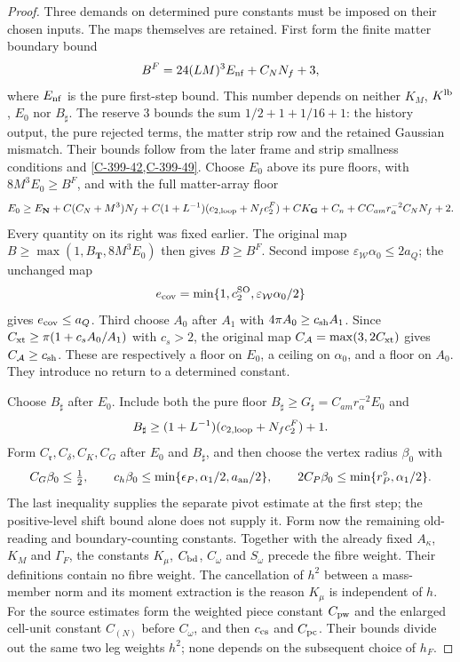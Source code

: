 \documentclass[11pt,letterpaper,reqno]{amsart}
\theoremstyle{definition}
\theoremstyle{remark}
\begin{document}
\begin{proof}
Three demands on determined pure constants must be imposed
on their chosen inputs. The maps themselves are retained.
First form the finite matter boundary bound
\[
 B^F=24(LM)^3E_{\rm nf}+C_NN_f+3,
\]
where $E_{\rm nf}$ is the pure first-step bound.
This number depends on neither $K_M$, $K^{\rm lb}$, $E_0$
nor $B_\sharp$. The reserve $3$ bounds the sum
$1/2+1+1/16+1$: the history output, the pure rejected
terms, the matter strip row and the retained Gaussian mismatch.
Their bounds follow from the later frame and strip smallness
conditions and \cref{C-399-42,C-399-49}. Choose $E_0$ above
its pure floors, with $8M^3E_0\ge B^F$, and with the full
matter-array floor
\[
 E_0\ge E_{\mathbf N}+C(C_N+M^3)N_f
 +C(1+L^{-1})(c_{2,\rm loop}+N_fc_2^F)
 +CK_{\mathbf G}+C_n+C C_{am}r_\alpha^{-2}C_NN_f+2.
\]
Every quantity on its right was fixed earlier.
The original map $B\ge\max(1,B_{\mathbf T},8M^3E_0)$ then
gives $B\ge B^F$. Second impose
$\varepsilon_{\mathcal W}\alpha_0\le2a_Q$; the unchanged map
\[
 e_{\rm cov}=\min\{1,c_2^{\rm SO},
                         \varepsilon_{\mathcal W}\alpha_0/2\}
\]
gives $e_{\rm cov}\le a_Q$.
Third choose $A_0$ after $A_1$ with
$4\pi A_0\ge c_{\rm sh}A_1$.
Since $C_{\rm xt}\ge\pi(1+c_sA_0/A_1)$ with $c_s>2$,
the original map $C_{\mathcal A}=\max(3,2C_{\rm xt})$
gives $C_{\mathcal A}\ge c_{\rm sh}$.
These are respectively a floor on $E_0$, a ceiling on
$\alpha_0$, and a floor on $A_0$. They introduce no return
to a determined constant.

Choose $B_\sharp$ after $E_0$. Include both the pure floor
$B_\sharp\ge G_\sharp=C_{am}r_\alpha^{-2}E_0$ and
\[
 B_\sharp\ge(1+L^{-1})(c_{2,\rm loop}+N_fc_2^F)+1.
\]
Form $C_{\mathfrak r},C_\delta,C_K,C_G$ after $E_0$ and
$B_\sharp$, and then choose the vertex radius $\beta_0$ with
\[
 C_G\beta_0\le\tfrac12,\qquad
 c_h\beta_0\le\min\{\epsilon_P,\alpha_1/2,a_{\rm an}/2\},
 \qquad 2C_P\beta_0\le\min\{r_P^\circ,\alpha_1/2\}.
\]
The last inequality supplies the separate pivot estimate at
the first step; the positive-level shift bound alone does
not supply it.
Form now the remaining old-reading and boundary-counting
constants. Together with the already fixed $A_\kappa$,
$K_M$ and $\Gamma_F$, the constants $K_\mu$, $C_{\rm bd}$,
$C_\omega$ and $S_\omega$ precede the fibre weight.
Their definitions contain no fibre weight. The cancellation of
$h^2$ between a mass-member norm and its moment extraction
is the reason $K_\mu$ is independent of $h$.
For the source estimates form the weighted piece constant
$C_{\rm pw}$ and the enlarged cell-unit constant $C_{(N)}$
before $C_\omega$, and then $c_{\rm cs}$ and $C_{\rm pc}$.
Their bounds divide out the same two leg weights $h^2$;
none depends on the subsequent choice of $h_F$.


\end{proof}
\end{document}
